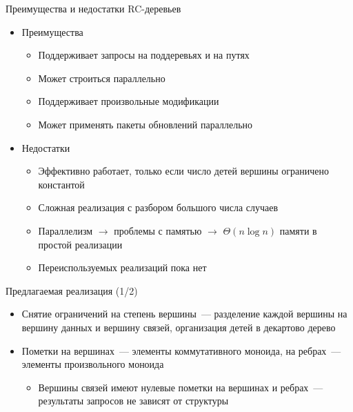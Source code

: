 \documentclass[hyperref=unicode,graphics=pdflatex,13pt]{beamer}
\begin{document}
\begin{frame}[shrink]{Преимущества и недостатки RC-деревьев}
\begin{itemize}
        \item Преимущества
	\begin{itemize}
    		\item Поддерживает запросы на поддеревьях и на путях
		\item Может строиться параллельно
		\item Поддерживает произвольные модификации
		\item Может применять пакеты обновлений параллельно
	\end{itemize}
\end{itemize}
\begin{itemize}
        \item Недостатки
	\begin{itemize}
	    \item Эффективно работает, только если число детей вершины ограничено константой
	    \item Сложная реализация с разбором большого числа случаев
	    \item Параллелизм $\to$ проблемы с памятью $\to$ $\Theta(n \log n)$ памяти в простой реализации
	    \item Переиспользуемых реализаций пока нет
	\end{itemize}
\end{itemize}
\end{frame}

\begin{frame}[shrink]{Предлагаемая реализация (1/2)}
\begin{itemize}
    \item Снятие ограничений на степень вершины~--- разделение каждой вершины на вершину данных и вершину связей,
          организация детей в декартово дерево
\end{itemize}
\begin{center}
\end{center}
\begin{itemize}
    \item Пометки на вершинах~--- элементы коммутативного моноида, на ребрах~--- элементы 
          произвольного моноида
    \begin{itemize}
        \item Вершины связей имеют нулевые пометки на вершинах и ребрах~--- результаты запросов
              не зависят от структуры
    \end{itemize}
\end{itemize}
\end{frame}
\end{document}
